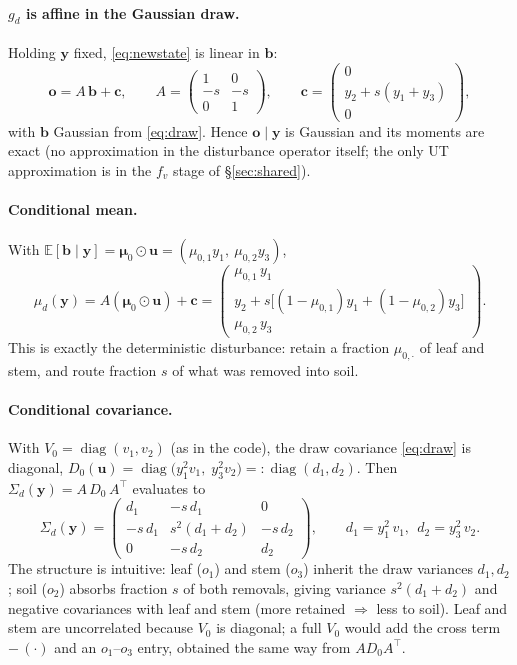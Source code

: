 \documentclass[11pt]{article}
\newcommand{\E}{\mathbb{E}}
\newcommand{\by}{\bm{y}}
\newcommand{\bm}[1]{\boldsymbol{#1}}
\newcommand{\bmu}{\bm{\mu}}
\DeclareMathOperator{\diag}{diag}
\begin{document}
\paragraph{$g_d$ is affine in the Gaussian draw.} Holding $\by$ fixed, \eqref{eq:newstate}
is linear in $\bm b$:
\begin{equation}
\label{eq:affine}
\bm o = A\,\bm b + \bm c,\qquad
A=\begin{pmatrix} 1 & 0\\ -s & -s\\ 0 & 1 \end{pmatrix},\qquad
\bm c=\begin{pmatrix} 0\\ y_2+s(y_1+y_3)\\ 0\end{pmatrix},
\end{equation}
with $\bm b$ Gaussian from \eqref{eq:draw}. Hence $\bm o\mid\by$ is Gaussian and its
moments are exact (no approximation in the disturbance operator itself; the only UT
approximation is in the $f_v$ stage of \S\ref{sec:shared}).

\paragraph{Conditional mean.} With $\E[\bm b\mid\by]=\bmu_0\odot\bm u
=(\mu_{0,1}y_1,\ \mu_{0,2}y_3)$,
\begin{equation}
\label{eq:mu_d}
\mu_d(\by)=A(\bmu_0\odot\bm u)+\bm c=
\begin{pmatrix}
\mu_{0,1}\,y_1\\[2pt]
y_2+s\big[(1-\mu_{0,1})y_1+(1-\mu_{0,2})y_3\big]\\[2pt]
\mu_{0,2}\,y_3
\end{pmatrix}.
\end{equation}
This is exactly the deterministic disturbance: retain a fraction $\mu_{0,\cdot}$ of leaf
and stem, and route fraction $s$ of what was removed into soil.

\paragraph{Conditional covariance.} With $V_0=\diag(v_1,v_2)$ (as in the code), the draw
covariance \eqref{eq:draw} is diagonal,
$D_0(\bm u)=\diag\!\big(y_1^2 v_1,\; y_3^2 v_2\big)=:\diag(d_1,d_2)$. Then
$\Sigma_d(\by)=A\,D_0\,A^\top$ evaluates to
\begin{equation}
\label{eq:Sig_d}
\Sigma_d(\by)=
\begin{pmatrix}
d_1 & -s\,d_1 & 0\\
-s\,d_1 & s^2(d_1+d_2) & -s\,d_2\\
0 & -s\,d_2 & d_2
\end{pmatrix},
\qquad d_1=y_1^2\,v_1,\ \ d_2=y_3^2\,v_2 .
\end{equation}
The structure is intuitive: leaf ($o_1$) and stem ($o_3$) inherit the draw variances
$d_1,d_2$; soil ($o_2$) absorbs fraction $s$ of both removals, giving variance
$s^2(d_1+d_2)$ and negative covariances with leaf and stem (more retained $\Rightarrow$
less to soil). Leaf and stem are uncorrelated because $V_0$ is diagonal; a full $V_0$
would add the cross term $-\,(\cdot)$ and an $o_1$--$o_3$ entry, obtained the same way
from $A D_0 A^\top$.
\end{document}
